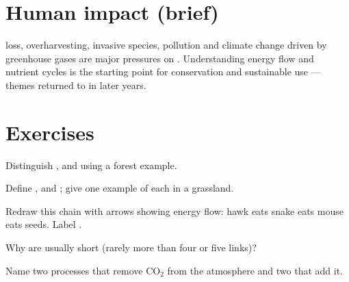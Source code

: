 \section{Human impact (brief)}

\begin{remark}[Pressures]\label{rem:g10:ecosystems:humans}
 loss, overharvesting, invasive species, pollution and climate
change driven by greenhouse gases are major pressures on .
Understanding energy flow and nutrient cycles is the starting point for
conservation and sustainable use --- themes returned to in later years.
\end{remark}

\section{Exercises}

\begin{exercise}[$\star$]\label{exo:g10:ecosystems:1}
Distinguish ,  and  using a forest example.
\end{exercise}

\begin{exercise}[$\star$]\label{exo:g10:ecosystems:2}
Define ,  and ; give one example of
each in a grassland.
\end{exercise}

\begin{exercise}[$\star$]\label{exo:g10:ecosystems:3}
Redraw this chain with arrows showing energy flow:
hawk eats snake eats mouse eats seeds. Label .
\end{exercise}

\begin{exercise}[$\star$]\label{exo:g10:ecosystems:4}
Why are  usually short (rarely more than four or five links)?
\end{exercise}

\begin{exercise}[$\star$]\label{exo:g10:ecosystems:5}
Name two processes that remove $\mathrm{CO_2}$ from the atmosphere and
two that add it.
\end{exercise}

